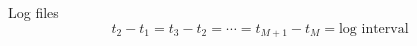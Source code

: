\documentclass{beamer}
\begin{document}
\begin{frame}{Log files}
$$t_2 - t_1 = t_3 - t_2 = \cdots = t_{M+1} - t_M = \text{log interval}$$
\end{frame}
\end{document}
